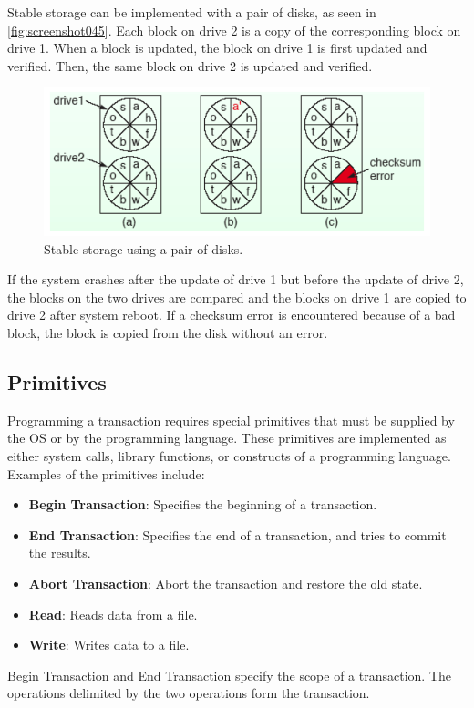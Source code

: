 Stable storage can be implemented with a pair of disks, as seen in \autoref{fig:screenshot045}. Each block on drive 2 is a copy of the corresponding block on drive 1. When a block is updated, the block on drive 1 is first updated and verified. Then, the same block on drive 2 is updated and verified. 

\begin{figure}
\centering
\includegraphics[width=0.7\linewidth]{figures/screenshot045}
\caption{Stable storage using a pair of disks.}
\label{fig:screenshot045}
\end{figure}

If the system crashes after the update of drive 1 but before the update of drive 2, the blocks on the two drives are compared and the blocks on drive 1 are copied to drive 2 after system reboot. If a checksum error is encountered because of a bad block, the block is copied from the disk without an error. 

\subsection{Primitives}
Programming a transaction requires special primitives that must be supplied by the OS or by the programming language. These primitives are implemented as either system calls, library functions, or constructs of a programming language.  Examples of the primitives include: \begin{itemize}
\item \textbf{Begin Transaction}: Specifies the beginning of a transaction. 
\item \textbf{End Transaction}: Specifies the end of a transaction, and tries to commit the results. 
\item \textbf{Abort Transaction}: Abort the transaction and restore the old state.
\item \textbf{Read}: Reads data from a file. 
\item \textbf{Write}: Writes data to a file. 
\end{itemize}

Begin Transaction and End Transaction specify the scope of a transaction. The operations delimited by the two operations form the transaction. 

